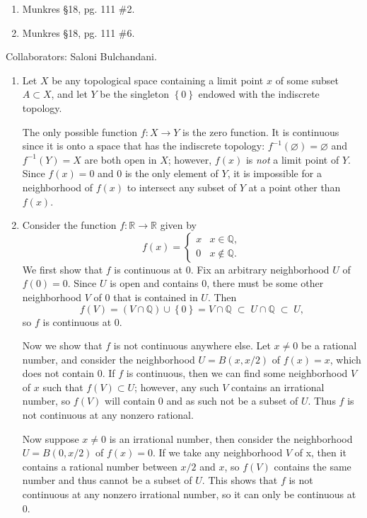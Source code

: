\documentclass[10pt]{report}
\begin{document}
\begin{exer}[7 points]
\begin{enumerate}
	\item Munkres \S 18, pg. 111 \#2.
	\item Munkres \S 18, pg. 111 \#6.
\end{enumerate}
\end{exer}
{\color{blue}Collaborators: Saloni Bulchandani.}

\begin{enumerate}
	\item Let $X$ be any topological space containing a limit point $x$ of some subset $A \subset X$, and let $Y$ be the singleton $\left\{ 0 \right\}$ endowed with the indiscrete topology.

		The only possible function $f:X\to Y$ is the zero function. It is continuous since it is onto a space that has the indiscrete topology: $f^{-1}(\varnothing)=\varnothing$ and $f^{-1}(Y) = X$ are both open in $X$; however, $f(x)$ is \textit{not} a limit point of $Y$. Since $f(x)=0$ and $0$ is the only element of $Y$, it is impossible for a neighborhood of $f(x)$ to intersect any subset of $Y$ at a point other than $f(x)$.

		\item Consider the function $f:\mathbb{R}\to \mathbb{R}$ given by
			\[
				f(x) =
				\begin{cases}
					x & x\in \mathbb{Q},\\
					0 & x\not\in\mathbb{Q}.
				\end{cases}
			\] 
			We first show that $f$ is continuous at 0. Fix an arbitrary neighborhood $U$ of $f(0)=0$. Since $U$ is open and contains 0, there must be some other neighborhood $V$ of 0 that is contained in $U$. Then
			\[
				f(V) = (V \cap \mathbb{Q}) \cup \left\{ 0 \right\} = V \cap \mathbb{Q} \;\subset\; U \cap \mathbb{Q} \;\subset\; U,
			\] so $f$ is continuous at 0.

			Now we show that $f$ is not continuous anywhere else. Let $x \neq 0$ be a rational number, and consider the neighborhood $U=B(x,x/2)$ of $f(x)=x$, which does not contain 0. If $f$ is continuous, then we can find some neighborhood $V$ of $x$ such that $f(V) \subset U$; however, any such $V$ contains an irrational number, so $f(V)$ will contain 0 and as such not be a subset of $U$. Thus $f$ is not continuous at any nonzero rational.

			Now suppose $x\neq 0$ is an irrational number, then consider the neighborhood $U=B(0,x/2)$ of $f(x)=0$. If we take any neighborhood $V$ of x, then it contains a rational number between $x/2$ and $x$, so $f(V)$ contains the same number and thus cannot be a subset of $U$. This shows that $f$ is not continuous at any nonzero irrational number, so it can only be continuous at 0.
\end{enumerate}
\pagebreak
\end{document}
